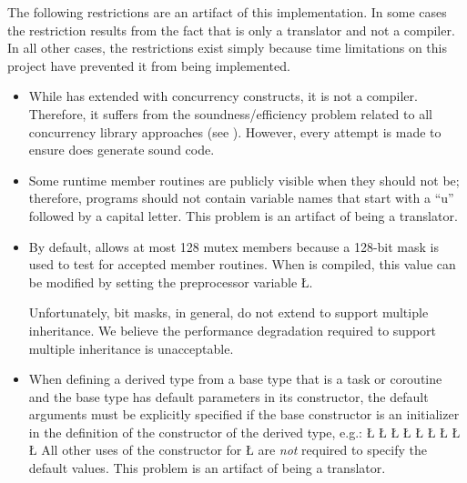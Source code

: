\documentclass[openright,twoside]{report}
\begin{document}
The following restrictions are an artifact of this implementation.
In some cases the restriction results from the fact that \uC is only a translator and not a compiler.
In all other cases, the restrictions exist simply because time limitations on this project have prevented it from being implemented.

\begin{itemize}
\item
While \uC has extended \CC with concurrency constructs, it is not a compiler.
Therefore, it suffers from the soundness/efficiency problem related to all concurrency library approaches (see ).
However, every attempt is made to ensure \uC does generate sound code.

\item
Some runtime member routines are publicly visible when they should not be;
therefore, \uC programs should not contain variable names that start with a ``u'' followed by a capital letter.
This problem is an artifact of \uC being a translator.

\item
By default, \uC allows at most 128 mutex members because a 128-bit mask is used to test for accepted member routines.
When \uC is compiled, this value can be modified by setting the preprocessor variable \LGinlinetrue\LGbegin\lgrinde\L{}\endlgrinde\LGend{}.

Unfortunately, bit masks, in general, do not extend to support multiple inheritance.
We believe the performance degradation required to support multiple inheritance is unacceptable.

\item
When defining a derived type from a base type that is a task or coroutine and the base type has default parameters in its constructor, the default arguments must be explicitly specified if the base constructor is an initializer in the definition of the constructor of the derived type, e.g.:
\LGinlinefalse\LGbegin\lgrinde
\L{}
\L{}
\L{\LB{}}
\L{\LB{\};}}
\L{\LB{}}
\L{}
\L{}
\L{\LB{}}
\CE{}\L{\LB{\};}}
\endlgrinde\LGend
All other uses of the constructor for \LGinlinetrue\LGbegin\lgrinde\L{}\endlgrinde\LGend{} are \emph{not} required to specify the default values.
This problem is an artifact of \uC being a translator.


\end{itemize}
\end{document}
